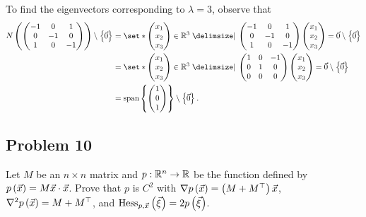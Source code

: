 \documentclass[main.tex]{subfiles}
\begin{document}
\begin{soln}
    To find the eigenvectors corresponding to $\lambda = 3$, observe that
    \begin{align*}
    N\parens{\begin{pmatrix}
        -1 & 0 & 1 \\
        0 & -1 & 0 \\
        1 & 0 & -1
    \end{pmatrix}} \setminus\braces{\vec{0}} &= \set*{\begin{pmatrix} x_1 \\ x_2 \\ x_3\end{pmatrix} \in \RR^3\mid \begin{pmatrix}
        -1 & 0 & 1 \\
        0 & -1 & 0 \\
        1 & 0 & -1
    \end{pmatrix}\begin{pmatrix} x_1 \\ x_2 \\ x_3\end{pmatrix} = \vec{0}}\setminus \braces{\vec{0}} \\
    &= \set*{\begin{pmatrix} x_1 \\ x_2 \\ x_3\end{pmatrix} \in \RR^3\mid \begin{pmatrix}
        1 & 0 & -1 \\
        0 & 1 & 0 \\
        0 & 0 & 0
    \end{pmatrix}\begin{pmatrix} x_1 \\ x_2 \\ x_3\end{pmatrix} = \vec{0}}\setminus \braces{\vec{0}} \\
    &= \vspan\braces{\begin{pmatrix}
        1 \\
        0 \\
        1
    \end{pmatrix}}\setminus \braces{\vec{0}}.
    \end{align*}
\end{soln}
\eject

\subsection{Problem 10}
\begin{claim}
    Let $M$ be an $n \times n$ matrix and $p : \mathbb R^n \to \mathbb R$ be the function defined by $p\left( \vec{x} \right) = M\vec{x} \cdot \vec{x}$. Prove that $p$ is $C^2$ with $\nabla p\left( \vec{x} \right) = \left( M + M^\top \right)\vec{x}$, $\nabla^2p\left( \vec{x} \right) = M + M^\top$, and $\operatorname{Hess}_{p,\vec{x}}\left( \vec\xi \right) = 2p\left( \vec\xi \right)$.
\end{claim}
\end{document}
